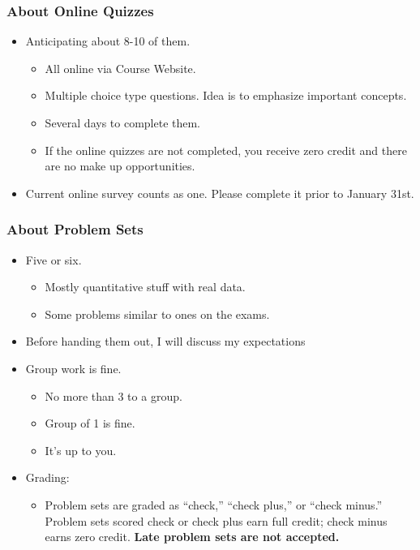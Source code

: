 \documentclass[10pt]{beamer}
\begin{document}
\begin{frame}[t]
\frametitle{About Online Quizzes}
\begin{itemize}
\item Anticipating about 8-10 of them.
\begin{itemize}
\medskip
\item All online via Course Website.
\medskip
\item Multiple choice type questions. Idea is to emphasize important concepts.
\medskip
\item Several days to complete them.
\medskip
\item If the online quizzes are not completed, you receive zero credit and there are no make up opportunities.
\end{itemize}
\bigskip
\item Current online survey counts as one. Please complete it prior to January 31st.
\bigskip
\end{itemize}
\end{frame}


\begin{frame}[t]
\frametitle{About Problem Sets}
\begin{itemize}
\item Five or six.
\begin{itemize}
\medskip
\item Mostly quantitative stuff with real data.
\medskip
\item Some problems similar to ones on the exams.
\end{itemize}
\bigskip
\item Before handing them out, I will discuss my expectations
\bigskip
\item Group work is fine.
\begin{itemize}
\medskip
\item No more than 3 to a group.
\medskip
\item Group of 1 is fine.
\medskip
\item It's up to you.
\end{itemize}
\bigskip
\item Grading:
\begin{itemize}
\medskip
\item Problem sets are graded as ``check,'' ``check plus,'' or ``check minus.'' Problem sets scored check or check plus earn full credit; check minus earns zero credit. \textbf{Late problem sets are not accepted.}
\end{itemize}
\end{itemize}
\end{frame}
\end{document}
